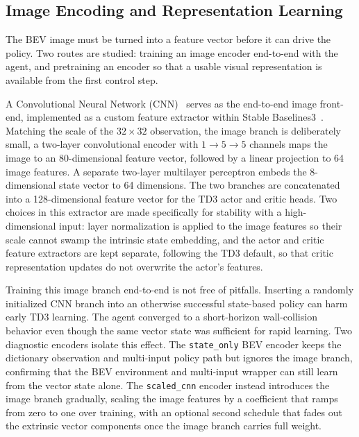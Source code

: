 \subsection{Image Encoding and Representation Learning}

The BEV image must be turned into a feature vector before it can drive the policy. Two routes are studied: training an image encoder end-to-end with the agent, and pretraining an encoder so that a usable visual representation is available from the first control step.

A Convolutional Neural Network (CNN)~\cite{lecun1998gradient} serves as the end-to-end image front-end, implemented as a custom feature extractor within Stable Baselines3~\cite{raffin2021sb3}. Matching the scale of the $32 \times 32$ observation, the image branch is deliberately small, a two-layer convolutional encoder with $1 \rightarrow 5 \rightarrow 5$ channels maps the image to an 80-dimensional feature vector, followed by a linear projection to 64 image features. A separate two-layer multilayer perceptron embeds the 8-dimensional state vector to 64 dimensions. The two branches are concatenated into a 128-dimensional feature vector for the TD3 actor and critic heads. Two choices in this extractor are made specifically for stability with a high-dimensional input: layer normalization is applied to the image features so their scale cannot swamp the intrinsic state embedding, and the actor and critic feature extractors are kept separate, following the TD3 default, so that critic representation updates do not overwrite the actor's features.

Training this image branch end-to-end is not free of pitfalls. Inserting a randomly initialized CNN branch into an otherwise successful state-based policy can harm early TD3 learning. The agent converged to a short-horizon wall-collision behavior even though the same vector state was sufficient for rapid learning. Two diagnostic encoders isolate this effect. The \texttt{state\_only} BEV encoder keeps the dictionary observation and multi-input policy path but ignores the image branch, confirming that the BEV environment and multi-input wrapper can still learn from the vector state alone. The \texttt{scaled\_cnn} encoder instead introduces the image branch gradually, scaling the image features by a coefficient that ramps from zero to one over training, with an optional second schedule that fades out the extrinsic vector components once the image branch carries full weight.


